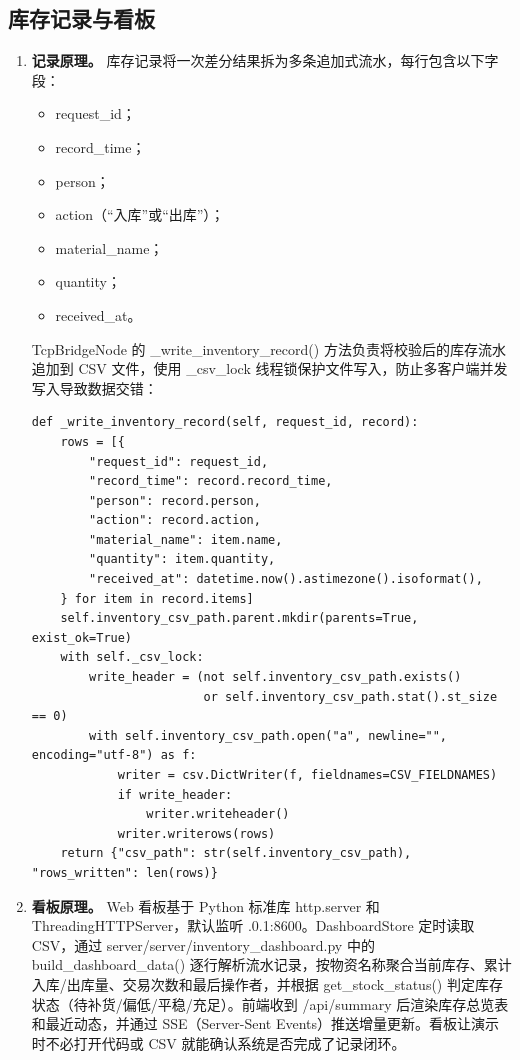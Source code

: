 \documentclass[12pt]{article}
\newcommand{\code}[1]{{\ttfamily #1}}
\begin{document}
\subsection{库存记录与看板}

\begin{enumerate}
	\item \textbf{记录原理。} 库存记录将一次差分结果拆为多条追加式流水，每行包含以下字段：

	      \begin{itemize}
		      \item \code{request\_id}；
		      \item \code{record\_time}；
		      \item \code{person}；
		      \item \code{action}（“入库”或“出库”）；
		      \item \code{material\_name}；
		      \item \code{quantity}；
		      \item \code{received\_at}。
	      \end{itemize}

	      \code{TcpBridgeNode} 的 \code{\_write\_inventory\_record()} 方法负责将校验后的库存流水追加到 CSV 文件，使用 \code{\_csv\_lock} 线程锁保护文件写入，防止多客户端并发写入导致数据交错：

	      \begin{lstlisting}[caption={CSV 库存记录写入（\code{tcp\_bridge\_node.py}）},label={lst:csv-write}]
def _write_inventory_record(self, request_id, record):
    rows = [{
        "request_id": request_id,
        "record_time": record.record_time,
        "person": record.person,
        "action": record.action,
        "material_name": item.name,
        "quantity": item.quantity,
        "received_at": datetime.now().astimezone().isoformat(),
    } for item in record.items]
    self.inventory_csv_path.parent.mkdir(parents=True, exist_ok=True)
    with self._csv_lock:
        write_header = (not self.inventory_csv_path.exists()
                        or self.inventory_csv_path.stat().st_size == 0)
        with self.inventory_csv_path.open("a", newline="", encoding="utf-8") as f:
            writer = csv.DictWriter(f, fieldnames=CSV_FIELDNAMES)
            if write_header:
                writer.writeheader()
            writer.writerows(rows)
    return {"csv_path": str(self.inventory_csv_path), "rows_written": len(rows)}
\end{lstlisting}

	\item \textbf{看板原理。} Web 看板基于 Python 标准库 \code{http.server} 和 \code{ThreadingHTTPServer}，默认监听 \code{127.0.0.1:8600}。\code{DashboardStore} 定时读取 CSV，通过 \code{server/server/inventory\_dashboard.py} 中的 \code{build\_dashboard\_data()} 逐行解析流水记录，按物资名称聚合当前库存、累计入库/出库量、交易次数和最后操作者，并根据 \code{get\_stock\_status()} 判定库存状态（待补货/偏低/平稳/充足）。前端收到 \code{/api/summary} 后渲染库存总览表和最近动态，并通过 SSE（Server-Sent Events）推送增量更新。看板让演示时不必打开代码或 CSV 就能确认系统是否完成了记录闭环。
\end{enumerate}
\end{document}
